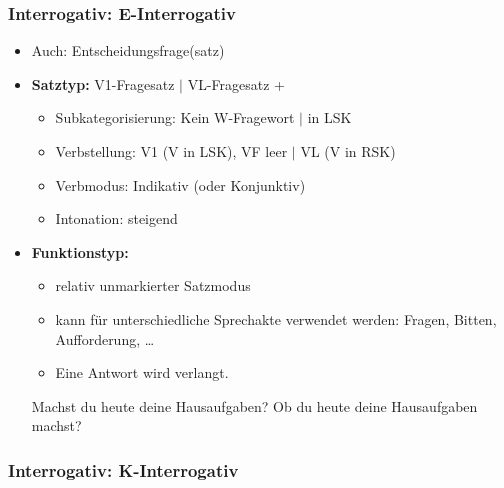 \begin{frame}
\frametitle{Interrogativ: E-Interrogativ}

\begin{itemize}
	\item Auch: Entscheidungsfrage(satz)
	\item \textbf{Satztyp:} V1-Fragesatz $|$ VL-Fragesatz + 
	\begin{itemize}
		\item Subkategorisierung: Kein W-Fragewort $|$  in LSK
		\item Verbstellung: V1 (V in LSK), VF leer $|$  VL (V in RSK)
		\item Verbmodus: Indikativ (oder Konjunktiv)
		\item Intonation: steigend
	\end{itemize}
	\item \textbf{Funktionstyp:}
	\begin{itemize}
		\item relativ unmarkierter Satzmodus
		\item kann für unterschiedliche Sprechakte verwendet werden: Fragen, Bitten, Aufforderung, \dots
		\item Eine Antwort wird verlangt.
	\end{itemize}
	
	\eal
	\ex Machst du heute deine Hausaufgaben?
	\ex Ob du heute deine Hausaufgaben machst?
	\zl
	
\end{itemize}

\end{frame}


\subsubsection{Interrogativ: K-Interrogativ}


